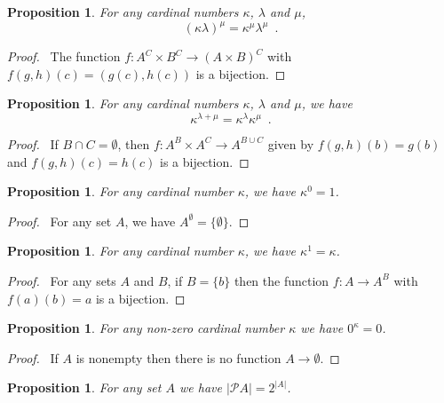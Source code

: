 \documentclass{book}
\let\qed\relax
\newtheorem{prop}[ax]{Proposition}
\theoremstyle{definition}
\begin{document}
\begin{prop}
For any cardinal numbers $\kappa$, $\lambda$ and $\mu$,
\[ (\kappa \lambda)^\mu = \kappa^\mu \lambda^\mu \enspace . \]
\end{prop}

\begin{proof}
\pf\ The function $f : A^C \times B^C \rightarrow (A \times B)^C$ with $f(g,h)(c) = (g(c),h(c))$ is a bijection. \qed
\end{proof}

\begin{prop}
For any cardinal numbers $\kappa$, $\lambda$ and $\mu$, we have
\[ \kappa^{\lambda + \mu} = \kappa^\lambda \kappa^\mu \enspace .\]
\end{prop}

\begin{proof}
\pf\ If $B \cap C = \emptyset$, then $f : A^B \times A^C \rightarrow A^{B \cup C}$ given by $f(g,h)(b) = g(b)$ and $f(g,h)(c) = h(c)$ is a bijection. \qed
\end{proof}

\begin{prop}
For any cardinal number $\kappa$, we have $\kappa^0 = 1$.
\end{prop}

\begin{proof}
\pf\ For any set $A$, we have $A^\emptyset = \{ \emptyset \}$. \qed
\end{proof}

\begin{prop}
For any cardinal number $\kappa$, we have $\kappa^1 = \kappa$.
\end{prop}

\begin{proof}
\pf\ For any sets $A$ and $B$, if $B = \{b\}$ then the function $f : A \rightarrow A^B$ with $f(a)(b) = a$ is a bijection. \qed
\end{proof}

\begin{prop}
For any non-zero cardinal number $\kappa$ we have $0^\kappa = 0$.
\end{prop}

\begin{proof}
\pf\ If $A$ is nonempty then there is no function $A \rightarrow \emptyset$. \qed
\end{proof}

\begin{prop}
For any set $A$ we have $|\mathcal{P} A| = 2^{|A|}$.
\end{prop}
\end{document}
